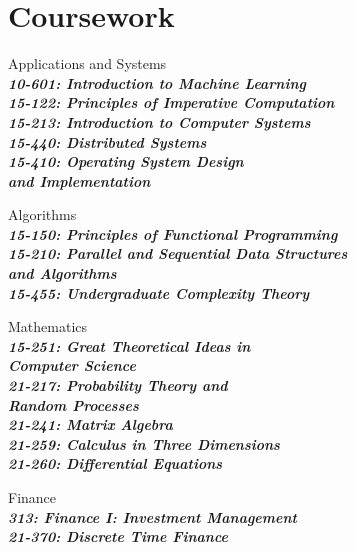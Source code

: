 \documentclass[letterpaper]{deedy-resume}
\begin{document}
\begin{minipage}[t]{0.33\textwidth}

    \section{Coursework}

    Applications and Systems\\
      \textit{\textbf{\footnotesize {
        \qquad{} 10-601: Introduction to Machine Learning\\
        \qquad{} 15-122: Principles of Imperative Computation\\
        \qquad{} 15-213: Introduction to Computer Systems\\
        \qquad{} 15-440: Distributed Systems\\
        \qquad{} 15-410: Operating System Design\\
        \qquad{}\qquad{} and Implementation\\
      }}}

    Algorithms\\
      \textit{\textbf{\footnotesize {
        \qquad{} 15-150: Principles of Functional Programming\\
        \qquad{} 15-210: Parallel and Sequential Data Structures\\
        \qquad{}\qquad{} and Algorithms\\
        \qquad{} 15-455: Undergraduate Complexity Theory\\
      }}}

    Mathematics\\
      \textit{\textbf{\footnotesize {
        \qquad{} 15-251: Great Theoretical Ideas in\\
        \qquad{}\qquad{} Computer Science\\
        \qquad{} 21-217: Probability Theory and\\
        \qquad{}\qquad{} Random Processes\\
        \qquad{} 21-241: Matrix Algebra\\
        \qquad{} 21-259: Calculus in Three Dimensions\\
        \qquad{} 21-260: Differential Equations\\
      }}}

    Finance\\
      \textit{\textbf{\footnotesize {
        \qquad{} 313: Finance I: Investment Management\\
        \qquad{} 21-370: Discrete Time Finance\\
      }}}


\end{minipage}
\end{document}
